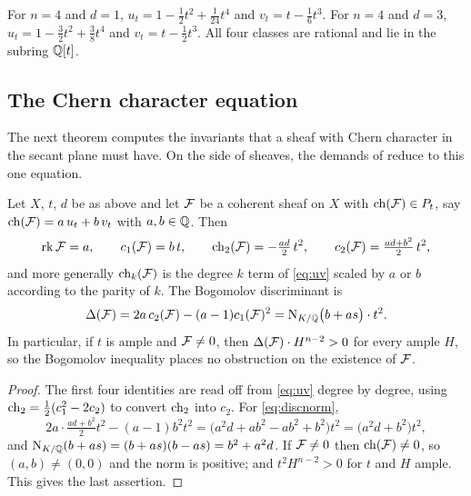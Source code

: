 \begin{example}\label{ex:planes}
For $n=4$ and $d=1$,
$u_{t}=1-\tfrac{1}{2}t^{2}+\tfrac{1}{24}t^{4}$ and
$v_{t}=t-\tfrac{1}{6}t^{3}$. For $n=4$ and $d=3$,
$u_{t}=1-\tfrac{3}{2}t^{2}+\tfrac{3}{8}t^{4}$ and
$v_{t}=t-\tfrac{1}{2}t^{3}$. All four classes are rational and lie in the
subring $\mathbb{Q}[t]$.
\end{example}

\subsection{The Chern character equation}

The next theorem computes the invariants that a sheaf with Chern character in
the secant plane must have. On the side of sheaves, the demands of
 reduce to this one equation.

\begin{theorem}\label{thm:secantinvariants}
Let $X$, $t$, $d$ be as above and let $\mathcal{F}$ be a coherent sheaf on $X$ with
$\operatorname{ch}(\mathcal{F})\in P_{t}$, say $\operatorname{ch}(\mathcal{F})=a\,u_{t}+b\,v_{t}$ with $a,b\in\mathbb{Q}$. Then
\[
  \operatorname{rk}\mathcal{F}=a,\qquad
  c_{1}(\mathcal{F})=b\,t,\qquad
  \operatorname{ch}_{2}(\mathcal{F})=-\tfrac{ad}{2}\,t^{2},\qquad
  c_{2}(\mathcal{F})=\tfrac{ad+b^{2}}{2}\,t^{2},
\]
and more generally $\operatorname{ch}_{k}(\mathcal{F})$ is the degree $k$ term of \eqref{eq:uv}
scaled by $a$ or $b$ according to the parity of $k$. The Bogomolov
discriminant is
\begin{equation}\label{eq:discnorm}
  \Delta(\mathcal{F})=2a\,c_{2}(\mathcal{F})-(a-1)c_{1}(\mathcal{F})^{2}
  =\mathrm{N}_{K/\mathbb{Q}}\bigl(b+a s\bigr)\cdot t^{2}.
\end{equation}
In particular, if $t$ is ample and $\mathcal{F}\ne0$, then
$\Delta(\mathcal{F})\cdot H^{n-2}>0$ for every ample $H$, so the Bogomolov inequality
places no obstruction on the existence of $\mathcal{F}$.
\end{theorem}

\begin{proof}
The first four identities are read off from \eqref{eq:uv} degree by degree,
using $\operatorname{ch}_{2}=\tfrac12(c_{1}^{2}-2c_{2})$ to convert $\operatorname{ch}_{2}$ into $c_{2}$.
For \eqref{eq:discnorm},
\[
  2a\cdot\tfrac{ad+b^{2}}{2}t^{2}-(a-1)b^{2}t^{2}
  =\bigl(a^{2}d+ab^{2}-ab^{2}+b^{2}\bigr)t^{2}
  =\bigl(a^{2}d+b^{2}\bigr)t^{2},
\]
and $\mathrm{N}_{K/\mathbb{Q}}(b+as)=(b+as)(b-as)=b^{2}+a^{2}d$. If $\mathcal{F}\ne0$ then
$\operatorname{ch}(\mathcal{F})\ne0$, so $(a,b)\ne(0,0)$ and the norm is positive; and
$t^{2}H^{n-2}>0$ for $t$ and $H$ ample. This gives the last assertion.
\end{proof}

